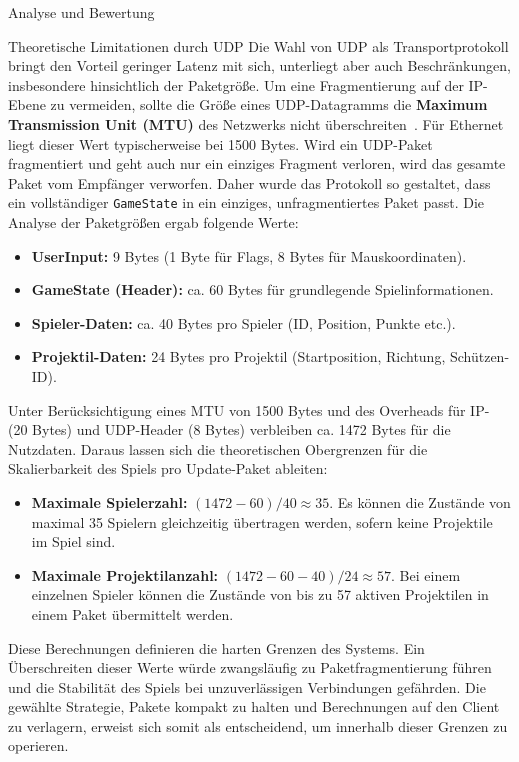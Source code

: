 \begin{section}{Analyse und Bewertung}
\begin{subsection}{Theoretische Limitationen durch UDP}
Die Wahl von UDP als Transportprotokoll bringt den Vorteil geringer Latenz mit sich, unterliegt aber auch Beschränkungen, insbesondere hinsichtlich der Paketgröße.
Um eine Fragmentierung auf der IP-Ebene zu vermeiden, sollte die Größe eines UDP-Datagramms die \textbf{Maximum Transmission Unit (MTU)} des Netzwerks nicht überschreiten~\cite{cisco}.
Für Ethernet liegt dieser Wert typischerweise bei 1500 Bytes. Wird ein UDP-Paket fragmentiert und geht auch nur ein einziges Fragment verloren, wird das gesamte Paket vom Empfänger verworfen.
Daher wurde das Protokoll so gestaltet, dass ein vollständiger \texttt{GameState} in ein einziges, unfragmentiertes Paket passt.
Die Analyse der Paketgrößen ergab folgende Werte:
\begin{itemize}
    \item \textbf{UserInput:} 9 Bytes (1 Byte für Flags, 8 Bytes für Mauskoordinaten).
\item \textbf{GameState (Header):} ca. 60 Bytes für grundlegende Spielinformationen.
    \item \textbf{Spieler-Daten:} ca. 40 Bytes pro Spieler (ID, Position, Punkte etc.).
\item \textbf{Projektil-Daten:} 24 Bytes pro Projektil (Startposition, Richtung, Schützen-ID).
\end{itemize}

Unter Berücksichtigung eines MTU von 1500 Bytes und des Overheads für IP- (20 Bytes) und UDP-Header (8 Bytes) verbleiben ca.
1472 Bytes für die Nutzdaten.
Daraus lassen sich die theoretischen Obergrenzen für die Skalierbarkeit des Spiels pro Update-Paket ableiten:
\begin{itemize}
    \item \textbf{Maximale Spielerzahl:} $(1472 - 60) / 40 \approx 35$.
Es können die Zustände von maximal 35 Spielern gleichzeitig übertragen werden, sofern keine Projektile im Spiel sind.
\item \textbf{Maximale Projektilanzahl:} $(1472 - 60 - 40) / 24 \approx 57$.
Bei einem einzelnen Spieler können die Zustände von bis zu 57 aktiven Projektilen in einem Paket übermittelt werden.
\end{itemize}
Diese Berechnungen definieren die harten Grenzen des Systems. Ein Überschreiten dieser Werte würde zwangsläufig zu Paketfragmentierung führen und die Stabilität des Spiels bei unzuverlässigen Verbindungen gefährden.
Die gewählte Strategie, Pakete kompakt zu halten und Berechnungen auf den Client zu verlagern, erweist sich somit als entscheidend, um innerhalb dieser Grenzen zu operieren.
\end{subsection}

\end{section}